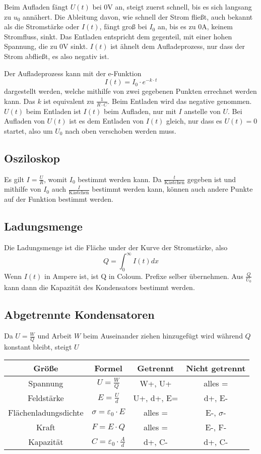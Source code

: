 \documentclass{article}\usepackage[a4paper]{geometry}
\begin{document}
Beim Aufladen fängt $U(t)$ bei $0$V an, steigt zuerst schnell, bis es sich langsang zu $u_0$ annähert. Die Ableitung davon, wie schnell der Strom fließt, auch bekannt als die Stromstärke oder $I(t)$, fängt groß bei $I_0$ an, bis es zu $0$A, keinem Stromfluss, sinkt. Das Entladen entspricht dem gegenteil, mit einer hohen Spannung, die zu $0$V sinkt. $I(t)$ ist ähnelt dem Aufladeprozess, nur dass der Strom abfließt, es also negativ ist. 
 
Der Aufladeprozess kann mit der e-Funktion \[I(t)=I_0 \cdot e^{-k \cdot t}\] dargestellt werden, welche mithilfe von zwei gegebenen Punkten errechnet werden kann. 
Das $k$ ist equivalent zu $\frac{1}{R \cdot C}$.
Beim Entladen wird das negative genommen. $U(t)$ beim Entladen ist $I(t)$ beim Aufladen, nur mit $I$ anstelle von $U$. Bei Aufladen von $U(t)$ ist es dem Entladen von $I(t)$ gleich, nur dass es $U(t)=0$ startet, also um $U_0$ nach oben verschoben werden muss.
 
\subsection{Osziloskop} 
Es gilt $I=\frac{U}{R}$, womit $I_0$ bestimmt werden kann. Da $\frac{t}{\text{Kästchen}}$ gegeben ist und mithilfe von $I_0$ auch $\frac{I}{\text{Kästchen}}$ bestimmt werden kann, können auch andere Punkte auf der Funktion bestimmt werden. 
 
\subsection{Ladungsmenge}
Die Ladungsmenge ist die Fläche under der Kurve der Stromstärke, also
\[Q=\int^\infty_0 I(t) dx\]
Wenn $I(t)$ in Ampere ist, ist Q in Coloum. Prefixe selber übernehmen.
Aus $\frac{Q}{U_0}$ kann dann die Kapazität des Kondensators bestimmt werden.
 
\subsection{Abgetrennte Kondensatoren} 
Da $U=\frac{W}{Q}$ und Arbeit $W$ beim Auseinander ziehen hinzugefügt wird während $Q$ konstant bleibt, steigt $U$  
  
\begin{center}
\begin{tabular}{ |c|c|c|c| }
\hline
 Größe & Formel & Getrennt & Nicht getrennt \\
\hline
 Spannung & $U=\frac{W}{Q}$ & W+, U+ & alles = \\
\hline
 Feldstärke & $E=\frac{U}{d}$ & U+, d+, E= & d+, E-\\
\hline
 Flächenladungsdichte & $\sigma=\varepsilon_0 \cdot E$ & alles = & E-, $\sigma$-\\
\hline
 Kraft & $F=E \cdot Q$ & alles = & E-, F-\\
\hline
 Kapazität & $C=\varepsilon_0 \cdot \frac{A}{d}$ & d+, C- & d+, C-\\
\hline
\end{tabular}
\end{center}
  
\end{document}
